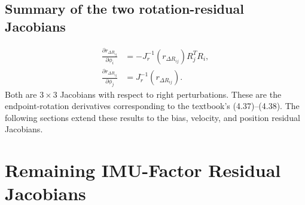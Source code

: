 \documentclass[11pt,a4paper]{article}
\begin{document}
\subsection{Summary of the two rotation-residual Jacobians}
\begin{align}
\frac{\partial r_{\Delta R_{ij}}}{\partial\phi_i}
&=-J_r^{-1}(r_{\Delta R_{ij}})R_j^TR_i,\\
\frac{\partial r_{\Delta R_{ij}}}{\partial\phi_j}
&=J_r^{-1}(r_{\Delta R_{ij}}).
\end{align}
Both are $3\times3$ Jacobians with respect to right perturbations.
These are the endpoint-rotation derivatives corresponding to the
textbook's (4.37)--(4.38). The following sections extend these results to the bias, velocity, and position residual Jacobians.


\section{Remaining IMU-Factor Residual Jacobians}
\end{document}
